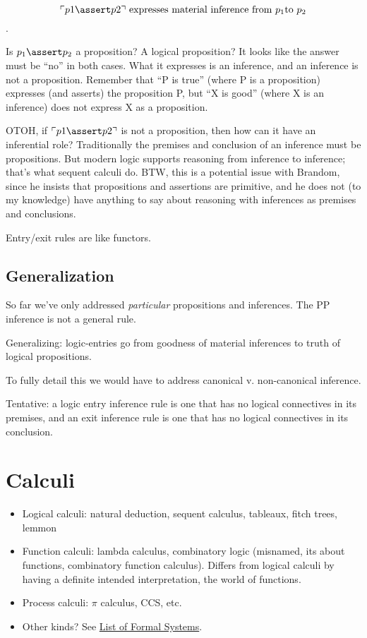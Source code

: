 \documentclass{article}
\begin{document}
\[\ulcorner p1\linfer p2\urcorner\ \text{expresses
material inference from}\ p_1 \text{to}\ p_2\].

Is \(p_1\linfer p_2\) a proposition? A logical proposition? It looks like
the answer must be ``no'' in both cases. What it expresses is an
inference, and an inference is not a proposition. Remember that ``P is
true'' (where P is a proposition) expresses (and asserts) the
proposition P, but ``X is good'' (where X is an inference) does not
express X as a proposition.

OTOH, if \(\ulcorner p1\linfer p2\urcorner\) is not a proposition, then
how can it have an inferential role? Traditionally the premises and
conclusion of an inference must be propositions. But modern logic
supports reasoning from inference to inference; that's what sequent
calculi do. BTW, this is a potential issue with Brandom, since he
insists that propositions and assertions are primitive, and he does
not (to my knowledge) have anything to say about reasoning with
inferences as premises and conclusions.

Entry/exit rules are like functors.

\subsection{Generalization}

So far we've only addressed \textit{particular} propositions and
inferences.  The PP inference is not a general rule.

Generalizing: logic-entries go from goodness of material inferences to
truth of logical propositions.

To fully detail this we would have to address canonical v.
non-canonical inference.

Tentative: a logic entry inference rule is one that has no logical
connectives in its premises, and an exit inference rule is one that
has no logical connectives in its conclusion.


\section{Calculi}

\begin{itemize}
\item Logical calculi: natural deduction, sequent calculus, tableaux, fitch trees, lemmon
\item Function calculi: lambda calculus, combinatory logic (misnamed, its
about functions, combinatory function calculus). Differs from logical
calculi by having a definite intended interpretation, the world of
functions.
\item Process calculi: \(\pi\) calculus, CCS, etc.
\item Other kinds?  See \href{https://en.wikipedia.org/wiki/List_of_formal_systems}{List of Formal Systems}.
\end{itemize}
\end{document}
